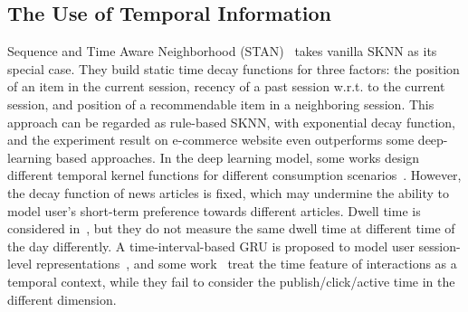 \subsection{The Use of Temporal Information}
Sequence and Time Aware Neighborhood (STAN)~\cite{garg2019sequence} takes vanilla SKNN as its special case. They build static time decay functions for three factors: the position of an item in the current session, recency of a past session w.r.t. to the current session, and position of a recommendable item in a neighboring session. This approach can be regarded as rule-based SKNN, with exponential decay function, and the experiment result on e-commerce website even outperforms some deep-learning based approaches. In the deep learning model, some works design different temporal kernel functions for different consumption scenarios~\cite{wang2020make, wu2020deja}. However, the decay function of news articles is fixed, which may undermine the ability to model user's short-term preference towards different articles. Dwell time is considered in~\cite{wu2020CPRS}, but they do not measure the same dwell time at different time of the day differently. A time-interval-based GRU is proposed to model user session-level representations~\cite{lei_tissa_2019}, and some work~\cite{rakkappan2019context,xu2019time,wu_recommender_2019} treat the time feature of interactions as a temporal context, while they fail to consider the publish/click/active time in the different dimension.
